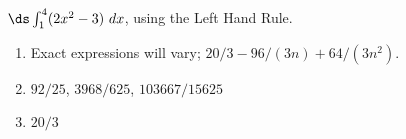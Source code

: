 {$\ds \int_{1}^4 (2x^2-3)\ dx$, using the Left Hand Rule.
}
{\begin{enumerate}
\item		Exact expressions will vary; $20/3-96/(3n)+64/(3n^2)$.
\item		$92/25$, $3968/625$, $103667/15625$
\item		$20/3$
\end{enumerate}
}


